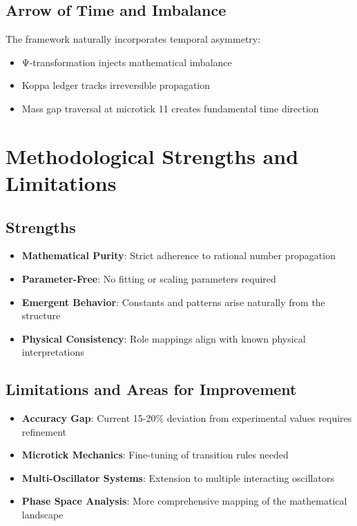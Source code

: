 \documentclass[12pt]{article}
\begin{document}
\subsection{Arrow of Time and Imbalance}

The framework naturally incorporates temporal asymmetry:

\begin{itemize}
\item Ψ-transformation injects mathematical imbalance
\item Koppa ledger tracks irreversible propagation
\item Mass gap traversal at microtick 11 creates fundamental time direction
\end{itemize}

\section{Methodological Strengths and Limitations}

\subsection{Strengths}

\begin{itemize}
\item \textbf{Mathematical Purity}: Strict adherence to rational number propagation
\item \textbf{Parameter-Free}: No fitting or scaling parameters required
\item \textbf{Emergent Behavior}: Constants and patterns arise naturally from the structure
\item \textbf{Physical Consistency}: Role mappings align with known physical interpretations
\end{itemize}

\subsection{Limitations and Areas for Improvement}

\begin{itemize}
\item \textbf{Accuracy Gap}: Current 15-20\% deviation from experimental values requires refinement
\item \textbf{Microtick Mechanics}: Fine-tuning of transition rules needed
\item \textbf{Multi-Oscillator Systems}: Extension to multiple interacting oscillators
\item \textbf{Phase Space Analysis}: More comprehensive mapping of the mathematical landscape
\end{itemize}
\end{document}
